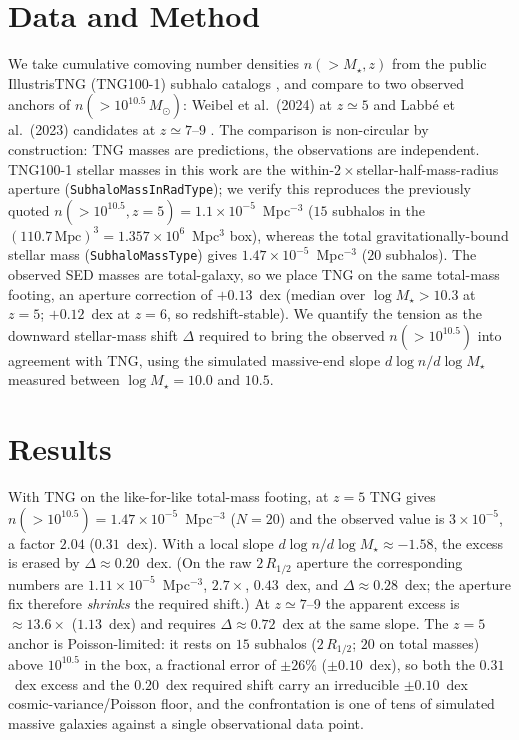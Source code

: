 \documentclass[twocolumn]{aastex631}
\begin{document}
\section{Data and Method}
We take cumulative comoving number densities $n(>M_\star,z)$ from the public IllustrisTNG (TNG100-1)
subhalo catalogs \citep{tng}, and compare to two observed anchors of $n(>10^{10.5}\,M_\odot)$: Weibel
et al.\ (2024) at $z\simeq5$ \citep{weibel24} and Labb\'e et al.\ (2023) candidates at $z\simeq7$--9
\citep{labbe23}. The comparison is non-circular by construction: TNG masses are predictions, the
observations are independent. TNG100-1 stellar masses in this work are the
within-$2\times$stellar-half-mass-radius aperture (\texttt{SubhaloMassInRadType}); we verify this
reproduces the previously quoted $n(>10^{10.5},z{=}5)=1.1\times10^{-5}$~Mpc$^{-3}$ ($15$ subhalos in
the $(110.7\,\mathrm{Mpc})^3=1.357\times10^6$~Mpc$^3$ box), whereas the total gravitationally-bound
stellar mass (\texttt{SubhaloMassType}) gives $1.47\times10^{-5}$~Mpc$^{-3}$ ($20$ subhalos). The
observed SED masses are total-galaxy, so we place TNG on the same total-mass footing, an aperture
correction of $+0.13$~dex (median over $\log M_\star>10.3$ at $z=5$; $+0.12$~dex at $z=6$, so
redshift-stable). We quantify the tension as the downward stellar-mass shift $\Delta$ required to
bring the observed $n(>10^{10.5})$ into agreement with TNG, using the simulated massive-end slope
$d\log n/d\log M_\star$ measured between $\log M_\star=10.0$ and $10.5$.

\section{Results}
With TNG on the like-for-like total-mass footing, at $z=5$ TNG gives $n(>10^{10.5})=1.47\times10^{-5}$~Mpc$^{-3}$
($N=20$) and the observed value is $3\times10^{-5}$, a factor $2.04$ ($0.31$~dex). With a local slope
$d\log n/d\log M_\star\approx-1.58$, the excess is erased by $\Delta\approx0.20$~dex. (On the raw
$2\,R_{1/2}$ aperture the corresponding numbers are $1.11\times10^{-5}$~Mpc$^{-3}$, $2.7\times$,
$0.43$~dex, and $\Delta\approx0.28$~dex; the aperture fix therefore \emph{shrinks} the required shift.)
At $z\simeq7$--9 the apparent excess is $\approx13.6\times$ ($1.13$~dex) and requires $\Delta\approx0.72$~dex
at the same slope. The $z=5$ anchor is Poisson-limited: it rests on $15$ subhalos ($2\,R_{1/2}$; $20$ on
total masses) above $10^{10.5}$ in the box, a fractional error of $\pm26\%$ ($\pm0.10$~dex), so both the
$0.31$~dex excess and the $0.20$~dex required shift carry an irreducible $\pm0.10$~dex cosmic-variance/Poisson
floor, and the confrontation is one of tens of simulated massive galaxies against a single observational
data point.
\end{document}
